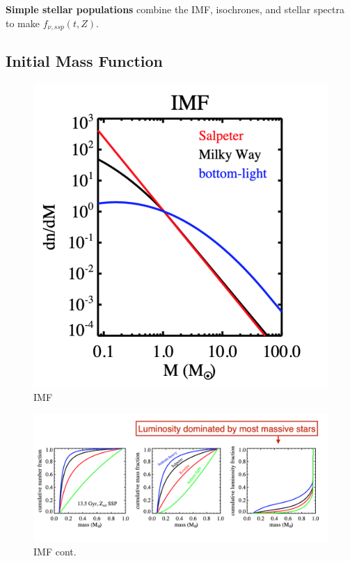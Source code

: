 \documentclass{article}
\begin{document}
\textbf{Simple stellar populations} combine the IMF, isochrones, and stellar spectra to make $\boxed{f_{\nu,ssp}(t,Z)}$.  

\subsection{Initial Mass Function}

\begin{figure}
    \centering
    \includegraphics{figs/Screen Shot 2021-09-17 at 9.20.04 AM.png}
    \caption{IMF}
    \label{fig:imf_imf}
\end{figure}

\begin{figure}
    \centering
    \includegraphics{figs/Screen Shot 2021-09-17 at 9.20.58 AM.png}
    \caption{IMF cont.}
    \label{fig:imfcont}
\end{figure}
\end{document}
